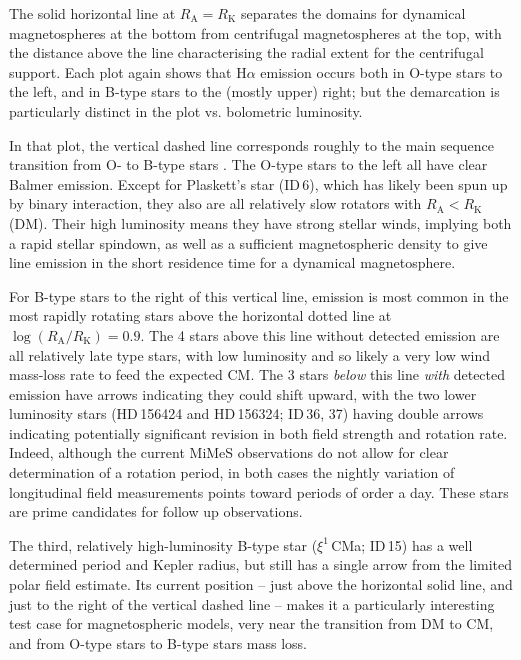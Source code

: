 \documentclass[useAMS,usenatbib]{mn2e}
\newcommand{\ra}{R_\mathrm{A}}
\newcommand{\rk}{R_\mathrm{K}}
\begin{document}
The solid horizontal line at $\ra = \rk$ separates the domains for dynamical magnetospheres at the bottom from centrifugal magnetospheres at the top, with the distance above the line characterising the radial extent for the centrifugal support.
Each plot again shows that H$\alpha$ emission occurs both in O-type stars to the left, and in B-type stars to the (mostly upper) right;  but the demarcation is particularly distinct in the plot vs. bolometric luminosity.

 In that plot, the vertical dashed line corresponds roughly to the main sequence transition from O- to B-type stars \citep{2005A&A...436.1049M}.
The O-type stars to the left all have clear Balmer emission. Except for Plaskett's star (ID\,6), which has likely been spun up by binary interaction, they also are all relatively slow rotators with $\ra < \rk$ (DM).
Their high luminosity means they have strong stellar winds, implying both a rapid stellar spindown, as well as a sufficient magnetospheric density to give line emission in the short residence time for a dynamical magnetosphere.

For B-type stars to the right of this vertical  line, emission is most common in the most rapidly rotating stars above the horizontal dotted line at $\log (\ra/\rk ) = 0.9$.
The 4 stars above this line without detected emission are all relatively late type stars, with low luminosity and so likely a very low wind mass-loss rate to feed the expected CM.
The 3 stars {\em below} this line {\em with} detected emission have arrows indicating they could shift upward, with the two lower luminosity stars (HD\,156424 and HD\,156324; ID\,36, 37) having double arrows indicating potentially significant revision in both field strength and rotation rate.
Indeed, although the current MiMeS observations do not allow for clear determination of a rotation period, in both cases the nightly variation of longitudinal field measurements points toward periods of order a day. These stars are prime candidates for follow up observations.

The third, relatively high-luminosity B-type star ($\xi^1$\,CMa; ID\,15) has a well determined period 
and Kepler radius,
 but still has a single arrow from 
the limited polar field estimate.
Its current position --  just above the horizontal solid line,  and just to the right of the vertical dashed line -- makes it a particularly interesting test case for magnetospheric models, very near the transition from DM to CM, and from O-type stars to B-type stars mass loss.
\end{document}
